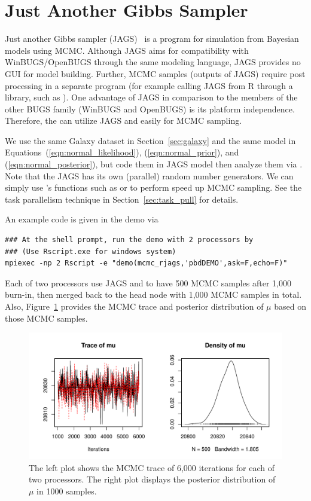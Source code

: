 \section[Just Another Gibbs Sampler]{Just Another Gibbs Sampler}
\label{sec:jags}

Just another Gibbs sampler (JAGS)~\citep{plummer2003} is a program for
simulation from Bayesian models using MCMC. Although JAGS aims for
compatibility with WinBUGS/OpenBUGS through the same modeling language,
JAGS provides no GUI for model building. Further, MCMC samples (outputs of
JAGS) require post processing in a separate program (for example calling JAGS
from R through a library, such as ).
One advantage of JAGS in comparison to the members of the other
BUGS family (WinBUGS and OpenBUGS) is its platform independence. Therefore,
the \pbdR can utilize JAGS and  easily for MCMC sampling.

We use the same Galaxy dataset in Section~\ref{sec:galaxy} and
the same model in Equations~(\ref{eqn:normal_likelihood}),
(\ref{eqn:normal_prior}), and (\ref{eqn:normal_posterior}), but
code them in JAGS model then analyze them via .
Note that the JAGS has its own (parallel) random number generators.
We can simply use 's functions such as  or
 to perform speed up MCMC sampling.
See the task parallelism
technique in Section~\ref{sec:task_pull} for details.

An example code is given in the  demo via
\begin{lstlisting}
### At the shell prompt, run the demo with 2 processors by
### (Use Rscript.exe for windows system)
mpiexec -np 2 Rscript -e "demo(mcmc_rjags,'pbdDEMO',ask=F,echo=F)"
\end{lstlisting}
Each of two processors use JAGS and  to have 500 MCMC samples
after 1,000 burn-in, then merged back to the head node with 1,000 MCMC samples
in total.
Also, Figure~\ref{fig:mcmc_rjags} provides the MCMC trace and
posterior distribution of $\mu$ based on those MCMC samples.
\begin{figure}[ht]
\centering
  \includegraphics[width=6.0in]{pbdDEMO-include/pics/galaxy_rjags}
\caption[MCMC results of velocities of 82 galaxies]{
The left plot shows the MCMC trace of 6,000 iterations for each of two
processors.
The right plot displays the posterior distribution of $\mu$ in 1000 samples.
}
\label{fig:mcmc_rjags}
\end{figure}




